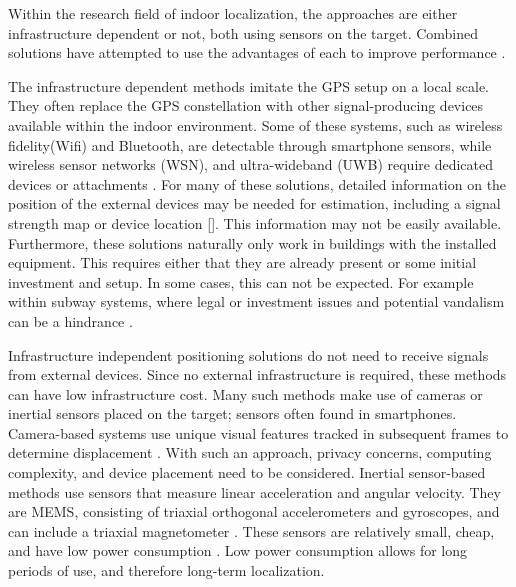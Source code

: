 Within the research field of indoor localization, the approaches are either infrastructure dependent or not, both using sensors on the target. Combined solutions have attempted to use the advantages of each to improve performance \cite{Gu2019, Correa2017}.\par

The infrastructure dependent methods imitate the GPS setup on a local scale. They often replace the GPS constellation with other signal-producing devices available within the indoor environment. Some of these systems, such as wireless fidelity(Wifi) and Bluetooth, are detectable through smartphone sensors, while wireless sensor networks (WSN), and ultra-wideband (UWB) require dedicated devices or attachments \cite{Wu2019,Jackermeier2018,Davidson2017}. For many of these solutions, detailed information on the position of the external devices may be needed for estimation, including a signal strength map or device location [\qn]. This information may not be easily available. Furthermore, these solutions naturally only work in buildings with the installed equipment. This requires either that they are already present or some initial investment and setup. In some cases, this can not be expected. For example within subway systems, where legal or investment issues and potential vandalism can be a hindrance \cite{Torok2014}. \par
%

Infrastructure independent positioning solutions do not need to receive signals from external devices. Since no external infrastructure is required, these methods can have low infrastructure cost. Many such methods make use of cameras or inertial sensors placed on the target; sensors often found in smartphones. Camera-based systems use unique visual features tracked in subsequent frames to determine displacement \cite{Gu2019}. With such an approach, privacy concerns, computing complexity, and device placement need to be considered. Inertial sensor-based methods use sensors that measure linear acceleration and angular velocity. They are \ac{MEMS},  consisting of triaxial orthogonal accelerometers and gyroscopes, and can include a triaxial magnetometer \cite{Yang2014}. These sensors are relatively small, cheap, and have low power consumption \cite{Olsson2016}. Low power consumption allows for long periods of use, and therefore long-term localization. \par

